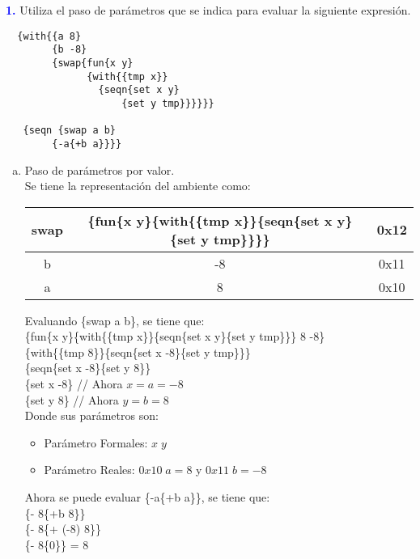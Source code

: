 \textbf{\textcolor{blue}{1.}} \Large
Utiliza el paso de parámetros que se indica para evaluar la siguiente expresión.
\begin{lstlisting}
  {with{{a 8}
        {b -8}
        {swap{fun{x y}
              {with{{tmp x}}
                {seqn{set x y}
                    {set y tmp}}}}}}

   {seqn {swap a b}
        {-a{+b a}}}}
\end{lstlisting}

\begin{enumerate}[a.]
\item Paso de parámetros por valor.\\
Se tiene la representación del ambiente como:

\begin{table}[h]
\centering
\renewcommand{\arraystretch}{1.5}
\begin{tabular}{ |c | c c |}
\hline
\textbf{swap} &
\textbf{ \{fun\{x y\}\{with\{\{tmp x\}\}\{seqn\{set x y\}\{set y tmp\}\}\}\} } & 0x12\\
\hline
b & -8  & 0x11\\
\hline
a & 8  & 0x10\\
\hline
\end{tabular}
\end{table}

Evaluando \{swap a b\}, se tiene que:\\

\{fun\{x y\}\{with\{\{tmp x\}\}\{seqn\{set x y\}\{set y tmp\}\}\} 8 -8\} \\
\{with\{\{tmp 8\}\}\{seqn\{set x -8\}\{set y tmp\}\}\} \\
\{seqn\{set x -8\}\{set y 8\}\} \\
\{set x -8\} // Ahora $x=a=-8$\\
\{set y 8\} // Ahora $y=b=8$\\

Donde sus parámetros son:
\begin{itemize}
    \item Parámetro Formales: $x \; y$
    \item Parámetro Reales: $0x10 \; a=8$ y $0x11 \; b=-8$
\end{itemize}

Ahora se puede evaluar \{-a\{+b a\}\}, se tiene que:\\
\{- 8\{+b 8\}\} \\
\{- 8\{+ (-8) 8\}\} \\
\{- 8\{0\}\} = 8 \\


\end{enumerate}
